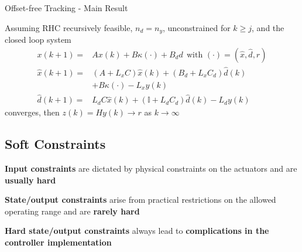 \begin{sstTitleBox}[BrickRed]{
		Offset-free Tracking - Main Result
	}
	\begin{sstOnlyFrame}[BrickRed]
		\begin{theorem}
			Assuming RHC recursively feasible, $n_d = n_y$,
			unconstrained for $k \geq j$,
			and the closed loop system
			\begin{align*}
				x(k+1)        = & Ax(k) + B\kappa(\cdot) + B_d d
				\ \  \text{with }(\cdot)=(\hat{x},\hat{d},r)                                     \\
				\hat{x}(k+1)  = & (A + L_x C)\hat{x}(k) + (B_d + L_x C_d)\hat{d}(k)              \\
				                & + B\kappa(\cdot) - L_x y(k)                                    \\
				\hat{d}(k+1)  = & L_d C \hat{x}(k) + (\mathbb{I} + L_d C_d)\hat{d}(k) - L_d y(k)
			\end{align*}
			converges, then $z(k) = Hy(k) \to r$
			as $k\to\infty$
		\end{theorem}
	\end{sstOnlyFrame}
\end{sstTitleBox}

\subsection{Soft Constraints}

\textbf{Input constraints} are dictated by physical constraints on
the actuators and are \textbf{usually hard }

\textbf{State/output constraints} arise from practical restrictions
on the allowed operating range and are \textbf{rarely hard}

\textbf{Hard state/output constraints} always lead to
\textbf{complications in the controller implementation}

